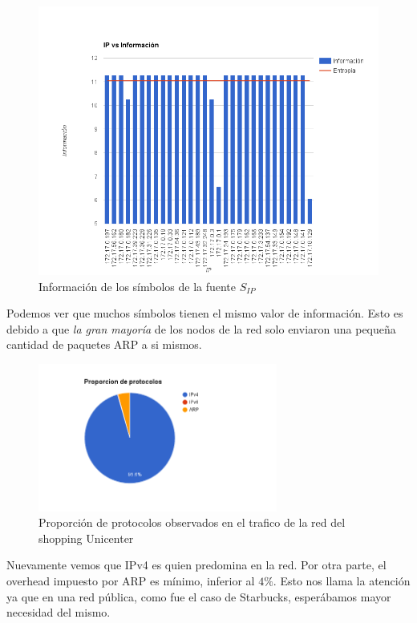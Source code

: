 \begin{figure}[H]
  \centering
    \includegraphics[width=1.1\textwidth]{imagenes/unicenter/ip_informacion.png}
    \caption{Información de los símbolos de la fuente $S_{IP}$}
  \label{fig:ejemplo}
\end{figure}

Podemos ver que muchos símbolos tienen el mismo valor de información. Esto es debido a que \textit{la gran mayoría} de los nodos de la red solo enviaron una pequeña cantidad de paquetes ARP a si mismos.

\begin{figure}[H]
  \centering
    \includegraphics[width=0.7\textwidth]{imagenes/unicenter/proporcion_protocolos.png}
  \caption{Proporción de protocolos observados en el trafico de la red del shopping Unicenter}
  \label{fig:ejemplo}
\end{figure}

Nuevamente vemos que IPv4 es quien predomina en la red.
Por otra parte, el overhead impuesto por ARP es mínimo, inferior al $4\%$. Esto nos llama la atención ya que en una red pública, como fue el caso de Starbucks, esperábamos mayor necesidad del mismo.

